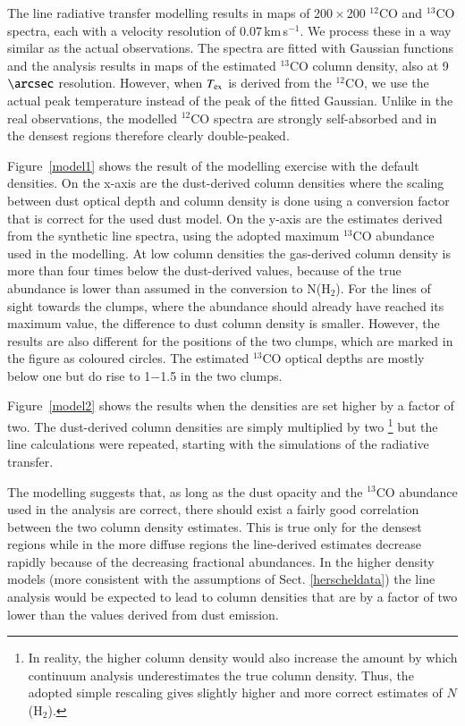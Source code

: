 \documentclass[printer]{aa}
\begin{document}
\begin{appendix}
The line radiative transfer modelling results in maps of 200\,$\times$\,200 $^{12}$CO and
$^{13}$CO spectra, each with a velocity resolution of 0.07\,km\,s$^{-1}$. We process
these in a way similar as the actual observations. The spectra are fitted with Gaussian
functions and the analysis results in maps of the estimated $^{13}$CO column density, 
also at 9\,$\arcsec$ resolution. However, when $T_{\rm ex}$ is derived from the $^{12}$CO,
we use the actual peak temperature instead of the peak of the fitted Gaussian. Unlike in
the real observations, the modelled $^{12}$CO spectra are strongly self-absorbed and in
the densest regions therefore clearly double-peaked. 

Figure~\ref{model1} shows the result of the modelling exercise with the default densities.
On the x-axis are the dust-derived column densities where the scaling between dust
optical depth and column density is done using a conversion factor that is correct for
the used dust model. On the y-axis are the estimates derived from the synthetic line
spectra, using the adopted maximum $^{13}$CO abundance used in the modelling. At low
column densities the gas-derived column density is more than four times below the dust-derived
values, because of the true abundance is lower than assumed in the conversion to
N(H$_2$). For the lines of sight towards the clumps, where the abundance should
already have reached its maximum value, the difference to dust column density is
smaller. However, the results are also different for the positions of the two clumps,
which are marked in the figure as coloured circles. The estimated $^{13}$CO optical
depths are mostly below one but do rise to 1$-$1.5 in the two clumps. 

Figure~\ref{model2} shows the results when the densities are set higher by a factor
of two. The dust-derived column densities are simply multiplied by two \footnote{In
reality, the higher column density would also increase the amount by which continuum
analysis underestimates the true column density. Thus, the adopted simple rescaling 
gives slightly higher and more correct estimates of $N$(H$_2$).} but the line
calculations were repeated, starting with the simulations of the radiative transfer.

The modelling suggests that, as long as the dust opacity and the $^{13}$CO abundance
used in the analysis are correct, there should exist a fairly good correlation between
the two column density estimates. This is true only for the densest regions while in the more
diffuse regions the line-derived estimates decrease rapidly because of the decreasing
fractional abundances. In the higher density models (more consistent with the
assumptions of Sect. \ref{herscheldata}) the line analysis would be expected to lead to column
densities that are by a factor of two lower than the values derived from dust emission.


\end{appendix}
\end{document}

